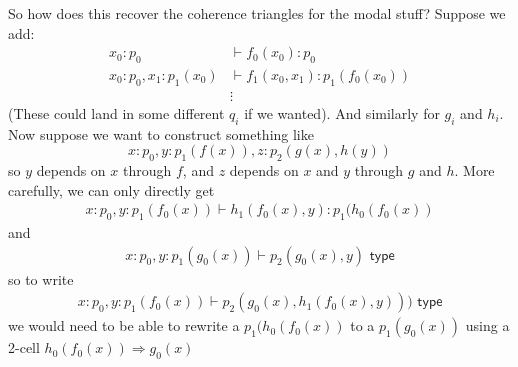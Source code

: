 \documentclass[10pt]{article}
\newcommand{\yields}{\vdash}
\newcommand{\type}{\,\,\mathsf{type}}
\begin{document}
So how does this recover the coherence triangles for the modal stuff? Suppose we add:
\begin{align*}
x_0 : p_0 &\yields f_0(x_0) : p_0 \\ 
x_0 : p_0, x_1 : p_1(x_0) &\yields f_1(x_0, x_1) : p_1(f_0(x_0)) \\
&\vdots
\end{align*}
(These could land in some different $q_i$ if we wanted). And similarly for $g_i$ and $h_i$. Now suppose we want to construct something like \[x:p_0, y : p_1(f(x)), z : p_2(g(x), h(y))\] so $y$ depends on $x$ through $f$, and $z$ depends on $x$ and $y$ through $g$ and $h$. More carefully, we can only directly get
\begin{align*}
x : p_0, y : p_1(f_0(x)) \yields h_1(f_0(x), y) : p_1(h_0(f_0(x))
\end{align*}
and 
\begin{align*}
x : p_0, y : p_1(g_0(x)) \yields p_2(g_0(x), y) \type
\end{align*}
so to write 
\begin{align*}
x : p_0, y : p_1(f_0(x)) \yields p_2(g_0(x), h_1(f_0(x), y))) \type
\end{align*}
we would need to be able to rewrite a $p_1(h_0(f_0(x))$ to a $p_1(g_0(x))$ using a 2-cell $h_0(f_0(x)) \Rightarrow g_0(x)$
\end{document}
